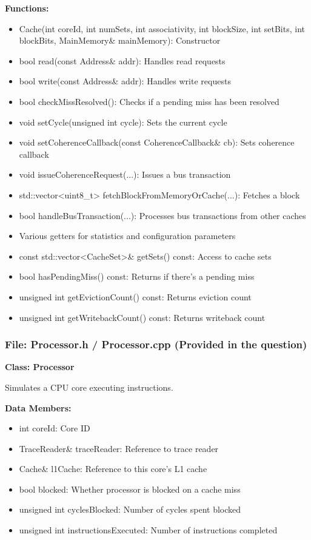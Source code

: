 \documentclass[12pt,a4paper]{article}
\begin{document}
\textbf{Functions:}
\begin{itemize}
    \item Cache(int coreId, int numSets, int associativity, int blockSize, int setBits, int blockBits, MainMemory\& mainMemory): Constructor
    \item bool read(const Address\& addr): Handles read requests
    \item bool write(const Address\& addr): Handles write requests
    \item bool checkMissResolved(): Checks if a pending miss has been resolved
    \item void setCycle(unsigned int cycle): Sets the current cycle
    \item void setCoherenceCallback(const CoherenceCallback\& cb): Sets coherence callback
    \item void issueCoherenceRequest(...): Issues a bus transaction
    \item std::vector<uint8\_t> fetchBlockFromMemoryOrCache(...): Fetches a block
    \item bool handleBusTransaction(...): Processes bus transactions from other caches
    \item Various getters for statistics and configuration parameters
    \item const std::vector<CacheSet>\& getSets() const: Access to cache sets
    \item bool hasPendingMiss() const: Returns if there's a pending miss
    \item unsigned int getEvictionCount() const: Returns eviction count
    \item unsigned int getWritebackCount() const: Returns writeback count
\end{itemize}

\subsubsection*{File: Processor.h / Processor.cpp (Provided in the question)}

\textbf{Class: Processor}

Simulates a CPU core executing instructions.

\textbf{Data Members:}
\begin{itemize}
    \item int coreId: Core ID
    \item TraceReader\& traceReader: Reference to trace reader
    \item Cache\& l1Cache: Reference to this core's L1 cache
    \item bool blocked: Whether processor is blocked on a cache miss
    \item unsigned int cyclesBlocked: Number of cycles spent blocked
    \item unsigned int instructionsExecuted: Number of instructions completed
\end{itemize}
\end{document}

